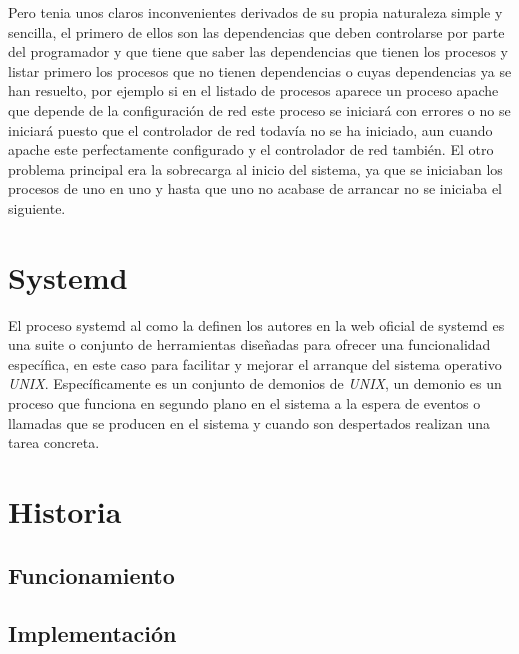 Pero tenia unos claros inconvenientes derivados de su propia naturaleza
simple y sencilla, el primero de ellos son las dependencias que 
deben controlarse por parte del programador y que tiene que saber las
dependencias que tienen los procesos y listar primero los procesos que no
tienen dependencias o cuyas dependencias ya se han resuelto, por ejemplo si en el listado
de procesos aparece un proceso apache que depende de la configuración de
red este proceso se iniciará con errores o no se iniciará puesto que el 
controlador de red todavía no se ha iniciado, aun cuando apache este 
perfectamente configurado y el controlador de red también. El otro
problema principal era la sobrecarga al inicio del sistema, ya que se 
iniciaban los procesos de uno en uno y hasta que uno no acabase de arrancar
no se iniciaba el siguiente.


\section{Systemd} %

El proceso systemd al como la definen los autores en la web oficial de
systemd \cite{systemd} es una suite o conjunto de herramientas diseñadas
para ofrecer una funcionalidad específica, en este caso para facilitar y
mejorar el arranque del sistema operativo \textit{UNIX}. Específicamente
es un conjunto de demonios de \textit{UNIX}, un demonio \cite{daemons} es un
proceso que funciona en segundo plano en el sistema a la espera de eventos
o llamadas que se producen en el sistema y cuando son despertados realizan
una tarea  concreta. 



\section{Historia}


\subsection{Funcionamiento}

\subsection{Implementación}


